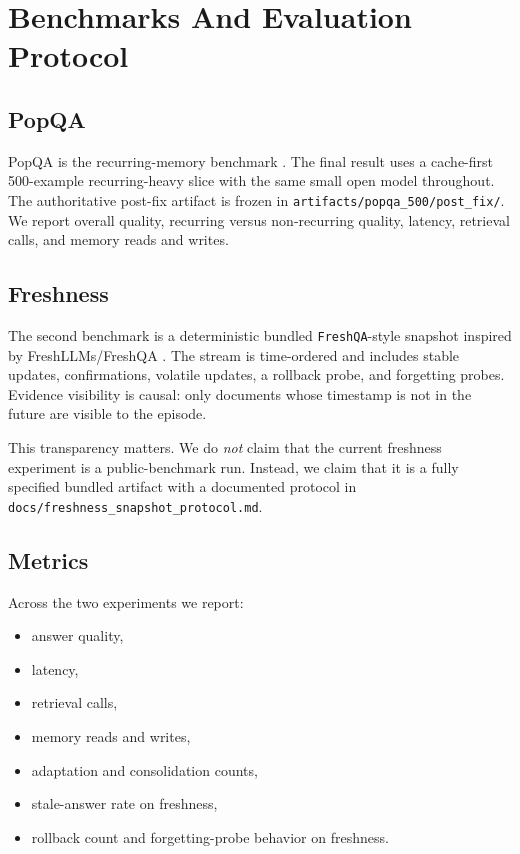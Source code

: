 \section{Benchmarks And Evaluation Protocol}

\subsection{PopQA}
PopQA is the recurring-memory benchmark \citep{mallen2022trust}. The final result uses a cache-first 500-example recurring-heavy slice with the same small open model throughout. The authoritative post-fix artifact is frozen in \texttt{artifacts/popqa\_500/post\_fix/}. We report overall quality, recurring versus non-recurring quality, latency, retrieval calls, and memory reads and writes.

\subsection{Freshness}
The second benchmark is a deterministic bundled \texttt{FreshQA}-style snapshot inspired by FreshLLMs/FreshQA \citep{vu2024freshllms}. The stream is time-ordered and includes stable updates, confirmations, volatile updates, a rollback probe, and forgetting probes. Evidence visibility is causal: only documents whose timestamp is not in the future are visible to the episode.

This transparency matters. We do \emph{not} claim that the current freshness experiment is a public-benchmark run. Instead, we claim that it is a fully specified bundled artifact with a documented protocol in \texttt{docs/freshness\_snapshot\_protocol.md}.

\subsection{Metrics}
Across the two experiments we report:
\begin{itemize}[leftmargin=1.5em]
\item answer quality,
\item latency,
\item retrieval calls,
\item memory reads and writes,
\item adaptation and consolidation counts,
\item stale-answer rate on freshness,
\item rollback count and forgetting-probe behavior on freshness.
\end{itemize}
